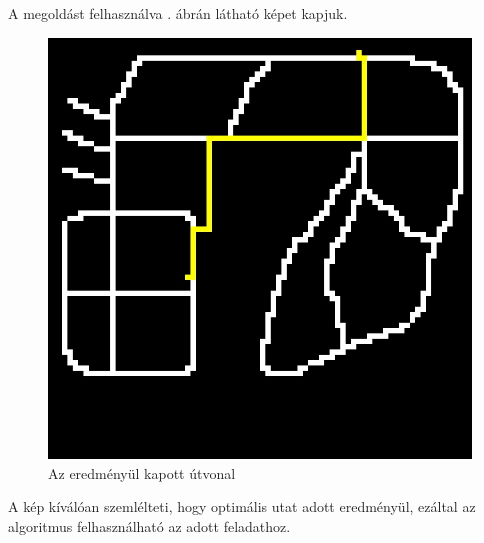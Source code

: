 A megoldást felhasználva . ábrán látható képet kapjuk.

\begin{figure}[h!]
\centering
\includegraphics[scale=0.6]{images/AStarResult.jpg}
\caption{Az eredményül kapott útvonal}
\label{fig:model1result}
\end{figure}

A kép kíválóan szemlélteti, hogy optimális utat adott eredményül, ezáltal az algoritmus felhasználható az adott feladathoz.
